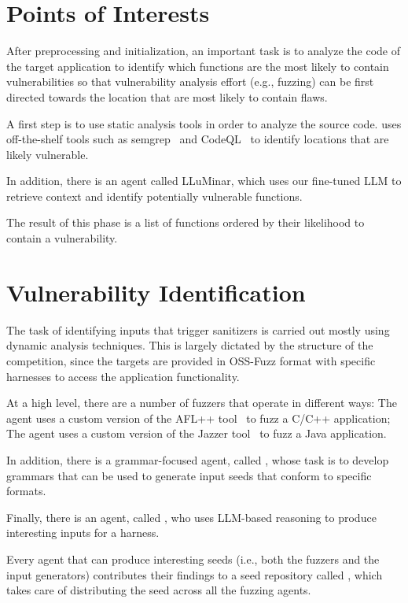 \section{Points of Interests}
\label{pointsofinterests}

After preprocessing and initialization, an important task is to analyze the code of the target application to identify which functions are the most likely to contain vulnerabilities so that vulnerability analysis effort (e.g., fuzzing) can be first directed towards the location that are most likely to contain flaws.

A first step is to use static analysis tools in order to analyze the source code.
\artiphishell uses off-the-shelf tools such as semgrep~\cite{semgrep} and CodeQL~\cite{codeql} to identify locations that are likely vulnerable.

In addition, there is an agent called LLuMinar, which uses our fine-tuned LLM to retrieve context and identify potentially vulnerable functions.

The result of this phase is a list of functions ordered by their likelihood to contain a vulnerability.


\section{Vulnerability Identification}
\label{detection}

The task of identifying inputs that trigger sanitizers is carried out mostly using dynamic analysis techniques.
This is largely dictated by the structure of the competition, since the targets are provided in OSS-Fuzz format with specific harnesses to access the application functionality.

At a high level, there are a number of fuzzers that operate in different ways: The \afluzzer agent uses a custom version of the AFL++ tool~\cite{aflplusplus} to fuzz a C/C++ application; The \jazzmine agent uses a custom version of the Jazzer tool~\cite{jazzer} to fuzz a Java application.

In addition, there is a grammar-focused agent, called \grammarguy, whose task is to develop grammars that can be used to generate input seeds that conform to specific formats.

Finally, there is an agent, called \quickseed, who uses LLM-based reasoning to produce interesting inputs for a harness.

Every agent that can produce interesting seeds (i.e., both the fuzzers and the input generators) contributes their findings to a seed repository called \seedsync, which takes care of distributing the seed across all the fuzzing agents.

